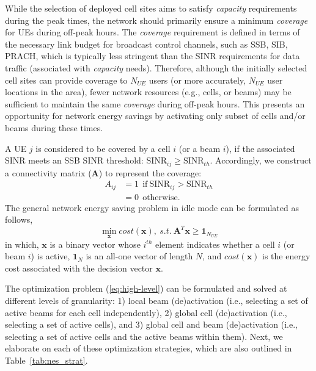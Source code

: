 While the selection of deployed cell sites 
aims to satisfy \textit{capacity} requirements during the peak times, the network should primarily ensure a minimum \textit{coverage} for UEs during off-peak hours. 
The \textit{coverage} requirement is defined in terms of the necessary link budget for broadcast control channels, such as SSB, SIB, PRACH, which is typically less stringent than the SINR requirements for data traffic (associated with \textit{capacity} needs).
Therefore, although the initially selected cell sites can provide coverage to $N_{UE}$ users (or more accurately, $N_{UE}$ user locations in the area), fewer network resources (e.g., cells, or beams) may be sufficient to maintain the same \textit{coverage} during off-peak hours. This presents an opportunity for network energy savings by activating only subset of cells and/or beams during these times.

A UE $j$ is considered to be covered by a cell $i$ (or a beam $i$), if the associated SINR meets an SSB SINR threshold: $\textrm{SINR}_{ij} \ge \textrm{SINR}_{th}$. 
Accordingly, we construct a connectivity matrix ($\bm{A}$) to represent the coverage: 
\begin{align}\label{eq:connectivity}
    A_{ij} &= 1~~\textrm{if}~ \textrm{SINR}_{ij}>\textrm{SINR}_{th} \\
             &= 0~~\textrm{otherwise.} \nonumber 
\end{align}
The general network energy saving problem in idle mode can be formulated as follows,
\begin{equation}\label{eq:high-level}
    \min_{\bm{x}} cost(\bm{x}), ~s.t. ~ {\bm{A}^T}\bm{x} \ge \bm{1}_{N_{UE}}
\end{equation}
in which, $\bm{x}$ is a binary vector whose $i^{th}$ element indicates whether a cell $i$ (or beam $i$) is active, $\bm{1}_{N}$ is an all-one vector of length $N$, and $cost(\bm{x})$ is the energy cost associated with the decision vector $\bm{x}$.

The optimization problem (\ref{eq:high-level}) can be formulated and solved at different levels of granularity: 1) local beam (de)activation (i.e., selecting a set of active beams for each cell independently), 2) global cell (de)activation (i.e., selecting a set of active cells), and 3) global cell and beam (de)activation (i.e., selecting a set of active cells and the active beams within them). Next, we elaborate on each of these optimization strategies, which are also outlined in Table~\ref{tab:nes_strat}.  

